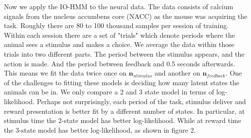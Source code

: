 \documentclass{article}
\begin{document}
Now we apply the IO-HMM to the neural data. The data consists of calcium signals from the nucleus accumbens core (NACC) as the mouse was acquiring the task. Roughly there are 80 to 100 thousand samples per session of training. Within each session there are a set of "trials" which denote periods where the animal sees a stimulus and makes a choice. We average the data within those trials into two different parts. The period between the stimulus appears, and the action is made. And the period between feedback and 0.5 seconds afterwards. This means we fit the data twice once on $\boldsymbol{n}_{stimulus}$ and another on $\boldsymbol{n}_{feedback}$. One of the challenges to fitting these models is deciding how many latent states the animals can be in. We only compare a 2 and 3 state model in terms of log-likelihood. Perhaps not surprisingly, each period of the task, stimulus deliver and reward presentation is better fit by a different number of states. In particular, at stimulus time the 2-state model has better log-likelihood. While at reward time the 3-state model has better log-likelihood, as shown in figure 2. 
\end{document}
